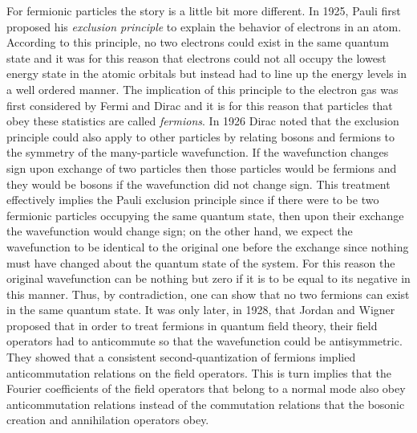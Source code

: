 For fermionic particles the story is a little bit more different.
In 1925, Pauli first proposed his {\it exclusion principle} to explain the behavior
of electrons in an atom. According to this principle, no two electrons could
exist in the same quantum state and it was for this reason that electrons could not
all occupy the lowest energy state in the atomic orbitals but instead had to line up
the energy levels in a well ordered manner. The implication of this principle to the
electron gas was first considered by Fermi and Dirac and it is for this reason that
particles that obey these statistics are called {\it fermions}. In 1926 Dirac noted that
the exclusion principle could also apply to other particles by relating bosons and
fermions to the symmetry of the many-particle wavefunction. If the wavefunction
changes sign upon exchange of two particles then those particles would be fermions
and they would be bosons if the wavefunction did not change sign. This treatment
effectively implies the Pauli exclusion principle since if there were to be two
fermionic particles occupying the same quantum state, then upon their exchange
the wavefunction would change sign; on the other hand, we expect the wavefunction
to be identical to the original one before the exchange since nothing must have
changed about the quantum state of the system. For this reason the original
wavefunction can be nothing but zero if it is to be equal to its negative in
this manner. Thus, by contradiction, one can show that no two fermions can exist
in the same quantum state. It was only later, in 1928, that Jordan and Wigner
proposed that in order to treat fermions in quantum field theory, their field
operators had to anticommute so that the wavefunction could be antisymmetric.
They showed that a consistent second-quantization of fermions implied anticommutation
relations on the field operators. This is turn implies that the Fourier coefficients
of the field operators that belong to a normal mode also obey anticommutation
relations instead of the commutation relations that the bosonic creation and
annihilation operators obey.


